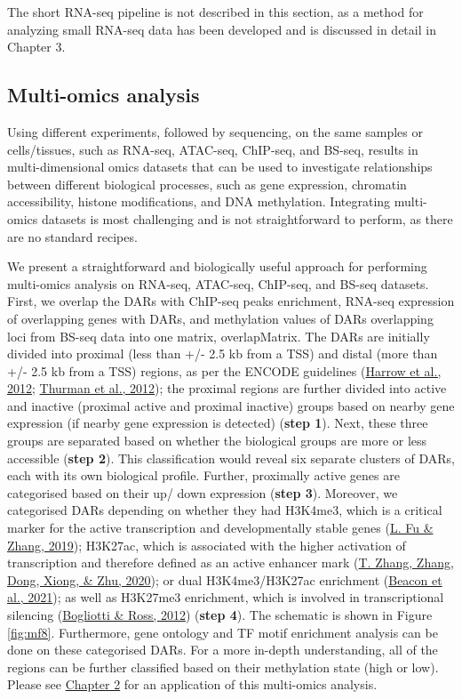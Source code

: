 \documentclass[12pt,twoside]{reedthesis}
\begin{document}
The short RNA-seq pipeline is not described in this section, as a method
for analyzing small RNA-seq data has been developed and is discussed in
detail in Chapter 3.

\hypertarget{m3.7}{%
\subsection*{Multi-omics analysis}\label{m3.7}}

Using different experiments, followed by sequencing, on the same samples
or cells/tissues, such as RNA-seq, ATAC-seq, ChIP-seq, and BS-seq,
results in multi-dimensional omics datasets that can be used to
investigate relationships between different biological processes, such
as gene expression, chromatin accessibility, histone modifications, and
DNA methylation. Integrating multi-omics datasets is most challenging
and is not straightforward to perform, as there are no standard recipes.

We present a straightforward and biologically useful approach for
performing multi-omics analysis on RNA-seq, ATAC-seq, ChIP-seq, and
BS-seq datasets. First, we overlap the DARs with ChIP-seq peaks enrichment, RNA-seq expression of overlapping
genes with DARs, and methylation values of DARs overlapping loci from
BS-seq data into one matrix, overlapMatrix. The DARs are initially
divided into proximal (less than +/- 2.5 kb from a TSS) and distal (more
than +/- 2.5 kb from a TSS) regions, as per the ENCODE guidelines
(\protect\hyperlink{ref-harrow2012}{Harrow et al., 2012}; \protect\hyperlink{ref-thurman2012}{Thurman et al., 2012}); the proximal regions are further divided
into active and inactive (proximal active and proximal inactive) groups
based on nearby gene expression (if nearby gene expression is detected)
(\textbf{step 1}). Next, these three groups are separated based on whether
the biological groups are more or less accessible (\textbf{step 2}). This
classification would reveal six separate clusters of DARs, each with its
own biological profile. Further, proximally active genes are categorised
based on their up/ down expression (\textbf{step 3}). Moreover, we
categorised DARs depending on whether they had H3K4me3, which is a
critical marker for the active transcription and developmentally stable
genes (\protect\hyperlink{ref-fu2019}{L. Fu \& Zhang, 2019}); H3K27ac, which is associated with the higher activation
of transcription and therefore defined as an active enhancer mark
(\protect\hyperlink{ref-zhang2020}{T. Zhang, Zhang, Dong, Xiong, \& Zhu, 2020}); or dual H3K4me3/H3K27ac enrichment (\protect\hyperlink{ref-beacon2021}{Beacon et al., 2021}); as well
as H3K27me3 enrichment, which is involved in transcriptional silencing
(\protect\hyperlink{ref-bogliotti2012}{Bogliotti \& Ross, 2012}) (\textbf{step 4}). The schematic is shown in Figure \ref{fig:mf8}. Furthermore, gene ontology and
TF motif enrichment analysis can be done on these
categorised DARs. For a more in-depth understanding, all of the regions
can be further classified based on their methylation state (high or
low). Please see \protect\hyperlink{chapter2}{Chapter 2} for an application of this multi-omics
analysis.
\end{document}
